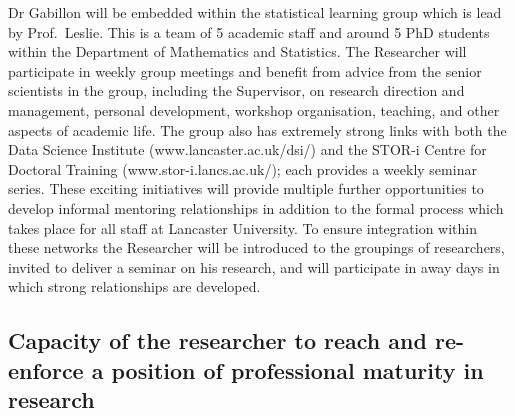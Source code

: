 \documentclass[a4paper,11pt]{article}
\begin{document}
Dr Gabillon will be embedded within the statistical learning group which is lead by Prof.\ Leslie.  This is a team of 5 academic staff and around 5 PhD students within the Department of Mathematics and Statistics.  The Researcher will participate in weekly group meetings and benefit from advice from the senior scientists in the group, including the Supervisor, on research direction and management, personal development, workshop organisation, teaching, and other aspects of academic life.  The group also has extremely strong links with both the Data Science Institute (www.lancaster.ac.uk/dsi/) and the STOR-i Centre for Doctoral Training (www.stor-i.lancs.ac.uk/); each provides a weekly seminar series.  These exciting initiatives will provide multiple further opportunities to develop informal mentoring relationships in addition to the formal process which takes place for all staff at Lancaster University.  To ensure integration within these networks the Researcher will be introduced to the groupings of researchers, invited to deliver a seminar on his research, and will participate in away days in which strong relationships are developed.


\subsection{Capacity of the researcher to reach and re-enforce a position of professional maturity in research}
\label{sec:maturity}

\end{document}
